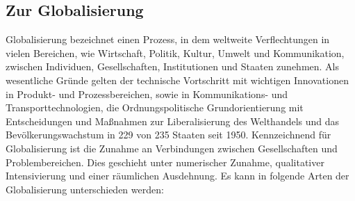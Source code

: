 \documentclass[12pt]{article}
\begin{document}
\subsection{Zur Globalisierung}
Globalisierung bezeichnet einen Prozess, in dem weltweite Verflechtungen in vielen Bereichen, wie Wirtschaft, Politik, Kultur, Umwelt und Kommunikation, zwischen Individuen, Gesellschaften, Institutionen und Staaten zunehmen. Als wesentliche Gründe gelten der technische Vortschritt mit wichtigen Innovationen in Produkt- und Prozessbereichen, sowie in Kommunikations- und Transporttechnologien, die Ordnungspolitische Grundorientierung mit Entscheidungen und Maßnahmen zur Liberalisierung des Welthandels und das Bevölkerungswachstum in 229 von 235 Staaten seit 1950. Kennzeichnend für Globalisierung ist die Zunahme an Verbindungen zwischen Gesellschaften und Problembereichen. Dies geschieht unter numerischer Zunahme, qualitativer Intensivierung und einer räumlichen Ausdehnung. Es kann in folgende Arten der Globalisierung unterschieden werden:
\end{document}
